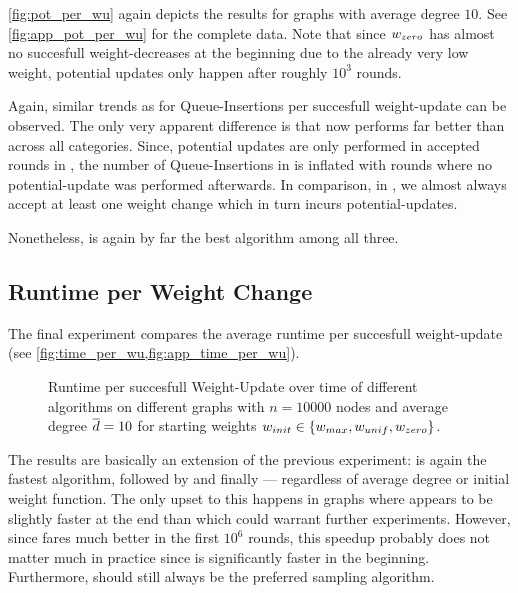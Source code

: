 \cref{fig:pot_per_wu} again depicts the results for graphs with average degree $10$.
See \cref{fig:app_pot_per_wu} for the complete data.
Note that since $w_{zero}$ has almost no succesfull weight-decreases at the beginning due to the already very low weight, potential updates only happen after roughly $10^3$ rounds.

Again, similar trends as for Queue-Insertions per succesfull weight-update can be observed.
The only very apparent difference is that now \algsp performs far better than \algns across all categories.
Since, potential updates are only performed in accepted rounds in \algsp, the number of Queue-Insertions in \algsp is inflated with rounds where no potential-update was performed afterwards.
In comparison, in \algns, we almost always accept at least one weight change which in turn incurs potential-updates.

Nonetheless, \algbp is again by far the best algorithm among all three.

\subsection{Runtime per Weight Change}
The final experiment compares the average runtime per succesfull weight-update (see \cref{fig:time_per_wu,fig:app_time_per_wu}). 

\begin{figure}[!tb]
  \centering
  \caption{
    Runtime per succesfull Weight-Update over time of different algorithms on different graphs with $n = 10000$ nodes and average degree $\overline{d} = 10$ for starting weights $w_{init} \in \left\{w_{max}, w_{unif}, w_{zero}\right\}$.
  }
  \label{fig:time_per_wu}
\end{figure}

The results are basically an extension of the previous experiment: \algbp is again the fastest algorithm, followed by \algsp and finally \algns --- regardless of average degree or initial weight function.
The only upset to this happens in \dsf graphs where \algns appears to be slightly faster at the end than \algsp which could warrant further experiments.
However, since \algsp fares much better in the first $10^6$ rounds, this speedup probably does not matter much in practice since \algsp is significantly faster in the beginning.
Furthermore, \algbp should still always be the preferred sampling algorithm.



